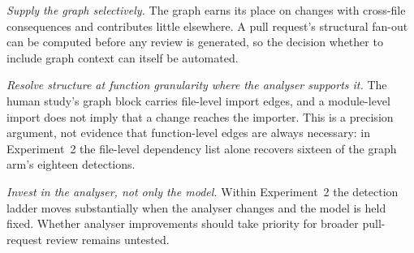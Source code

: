 \emph{Supply the graph selectively.} The graph earns its place on changes
with cross-file consequences and contributes little elsewhere. A pull
request's structural fan-out can be computed before any review is generated,
so the decision whether to include graph context can itself be automated.

\emph{Resolve structure at function granularity where the analyser supports
it.} The human study's graph block carries file-level import edges, and a
module-level import does not imply that a change reaches the importer. This is a precision argument, not evidence that
function-level edges are always necessary: in Experiment~2 the file-level
dependency list alone recovers sixteen of the graph arm's eighteen
detections.

\emph{Invest in the analyser, not only the model.} Within Experiment~2 the
detection ladder moves substantially when the analyser changes and the model
is held fixed. Whether analyser improvements should take priority for
broader pull-request review remains untested.
